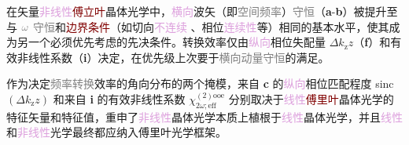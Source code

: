 在矢量\textcolor{Plum}{非线性}\textcolor{Maroon}{傅立叶}\textcolor{PineGreen}{晶体光学}中，\textcolor{Plum}{横向}\textcolor{PineGreen}{波矢}（即\textcolor{gray}{空间频率}）\textcolor{gray}{守恒}（\textbf{a}-\textbf{b}）被提升至与 $\mathcolor{gray}{\omega}$ \textcolor{gray}{守恒}和\textcolor{Maroon}{边界条件}（如切向\textcolor{Plum}{不连续} 、相位\textcolor{Plum}{连续性}等）相同的基本水平，使其成为另一个必须优先考虑的先决条件。转换效率仅由\textcolor{Plum}{纵向}\textcolor{PineGreen}{相位失配量} $\Delta k_\mathrm{z} z$（\textbf{f}）和\textcolor{NavyBlue}{有效非线性系数}（\textbf{i}）决定\cite{midwinterEffectsPhaseMatching1965,yaoAccurateCalculationOptimum1992,dmitrievEffectiveNonlinearityCoefficients1993,diesperovEffectiveNonlinearCoefficient1997}，在优先级上次要于\textcolor{gray}{横向动量守恒}的满足。

作为决定\textcolor{gray}{频率转换}效率的角向分布的两个掩模，来自 \textbf{c} 的\textcolor{Plum}{纵向}\textcolor{PineGreen}{相位匹配程度} sinc$(\Delta k_\mathrm{z} z)$ 和来自 \textbf{i} 的\textcolor{NavyBlue}{有效非线性系数} $\chi^{(2)\text{ooe}}_{2\omega;\text{eff}}$ 分别取决于\textcolor{Plum}{线性}\textcolor{Maroon}{傅里叶}\textcolor{PineGreen}{晶体光学}的\textcolor{PineGreen}{特征矢量}和\textcolor{PineGreen}{特征值}，重申了\textcolor{Plum}{非线性}\textcolor{PineGreen}{晶体光学}本质上植根于\textcolor{Plum}{线性}\textcolor{PineGreen}{晶体光学}，并且\textcolor{Plum}{线性}和\textcolor{Plum}{非线性}\textcolor{NavyBlue}{光学}最终都应纳入\textcolor{NavyBlue}{傅里叶光学}框架。

